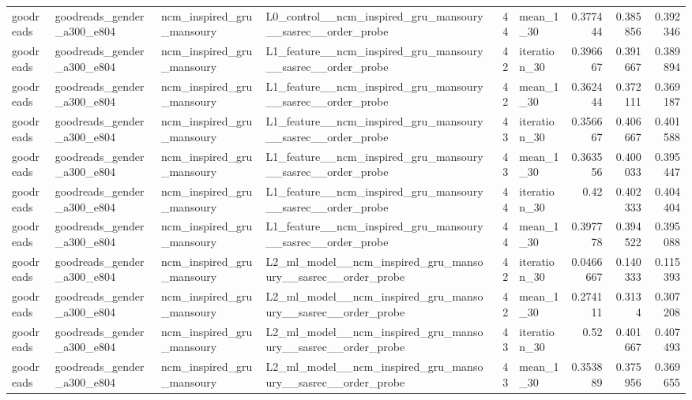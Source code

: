 \begin{table}[htbp!]
\begin{tabular}{llllrlrrr}
goodreads & goodreads\_gender\_a300\_e804 & ncm\_inspired\_gru\_mansoury & L0\_control\_\_ncm\_inspired\_gru\_mansoury\_\_sasrec\_\_order\_probe & 44 & mean\_1\_30 & 0.377444 & 0.385856 & 0.392346 \\
goodreads & goodreads\_gender\_a300\_e804 & ncm\_inspired\_gru\_mansoury & L1\_feature\_\_ncm\_inspired\_gru\_mansoury\_\_sasrec\_\_order\_probe & 42 & iteration\_30 & 0.396667 & 0.391667 & 0.389894 \\
goodreads & goodreads\_gender\_a300\_e804 & ncm\_inspired\_gru\_mansoury & L1\_feature\_\_ncm\_inspired\_gru\_mansoury\_\_sasrec\_\_order\_probe & 42 & mean\_1\_30 & 0.362444 & 0.372111 & 0.369187 \\
goodreads & goodreads\_gender\_a300\_e804 & ncm\_inspired\_gru\_mansoury & L1\_feature\_\_ncm\_inspired\_gru\_mansoury\_\_sasrec\_\_order\_probe & 43 & iteration\_30 & 0.356667 & 0.406667 & 0.401588 \\
goodreads & goodreads\_gender\_a300\_e804 & ncm\_inspired\_gru\_mansoury & L1\_feature\_\_ncm\_inspired\_gru\_mansoury\_\_sasrec\_\_order\_probe & 43 & mean\_1\_30 & 0.363556 & 0.400033 & 0.395447 \\
goodreads & goodreads\_gender\_a300\_e804 & ncm\_inspired\_gru\_mansoury & L1\_feature\_\_ncm\_inspired\_gru\_mansoury\_\_sasrec\_\_order\_probe & 44 & iteration\_30 & 0.42 & 0.402333 & 0.404404 \\
goodreads & goodreads\_gender\_a300\_e804 & ncm\_inspired\_gru\_mansoury & L1\_feature\_\_ncm\_inspired\_gru\_mansoury\_\_sasrec\_\_order\_probe & 44 & mean\_1\_30 & 0.397778 & 0.394522 & 0.395088 \\
goodreads & goodreads\_gender\_a300\_e804 & ncm\_inspired\_gru\_mansoury & L2\_ml\_model\_\_ncm\_inspired\_gru\_mansoury\_\_sasrec\_\_order\_probe & 42 & iteration\_30 & 0.0466667 & 0.140333 & 0.115393 \\
goodreads & goodreads\_gender\_a300\_e804 & ncm\_inspired\_gru\_mansoury & L2\_ml\_model\_\_ncm\_inspired\_gru\_mansoury\_\_sasrec\_\_order\_probe & 42 & mean\_1\_30 & 0.274111 & 0.3134 & 0.307208 \\
goodreads & goodreads\_gender\_a300\_e804 & ncm\_inspired\_gru\_mansoury & L2\_ml\_model\_\_ncm\_inspired\_gru\_mansoury\_\_sasrec\_\_order\_probe & 43 & iteration\_30 & 0.52 & 0.401667 & 0.407493 \\
goodreads & goodreads\_gender\_a300\_e804 & ncm\_inspired\_gru\_mansoury & L2\_ml\_model\_\_ncm\_inspired\_gru\_mansoury\_\_sasrec\_\_order\_probe & 43 & mean\_1\_30 & 0.353889 & 0.375956 & 0.369655 \\

\end{tabular}
\end{table}
